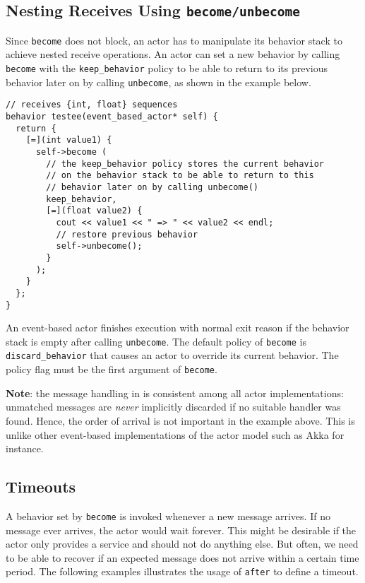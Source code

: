 \clearpage
\subsection{Nesting Receives Using \lstinline^become/unbecome^}

Since \lstinline^become^ does not block, an actor has to manipulate its behavior stack to achieve nested receive operations.
An actor can set a new behavior by calling \lstinline^become^ with the \lstinline^keep_behavior^ policy to be able to return to its previous behavior later on by calling \lstinline^unbecome^, as shown in the example below.

\begin{lstlisting}
// receives {int, float} sequences
behavior testee(event_based_actor* self) {
  return {
    [=](int value1) {
      self->become (
        // the keep_behavior policy stores the current behavior
        // on the behavior stack to be able to return to this
        // behavior later on by calling unbecome()
        keep_behavior,
        [=](float value2) {
          cout << value1 << " => " << value2 << endl;
          // restore previous behavior
          self->unbecome();
        }
      );
    }
  };
}
\end{lstlisting}

An event-based actor finishes execution with normal exit reason if the behavior stack is empty after calling \lstinline^unbecome^.
The default policy of \lstinline^become^ is \lstinline^discard_behavior^ that causes an actor to override its current behavior.
The policy flag must be the first argument of \lstinline^become^.

\textbf{Note}: the message handling in \lib is consistent among all actor implementations: unmatched messages are \textit{never} implicitly discarded if no suitable handler was found.
Hence, the order of arrival is not important in the example above.
This is unlike other event-based implementations of the actor model such as Akka for instance.

\clearpage
\subsection{Timeouts}

A behavior set by \lstinline^become^ is invoked whenever a new message arrives.
If no message ever arrives, the actor would wait forever.
This might be desirable if the actor only provides a service and should not do anything else.
But often, we need to be able to recover if an expected message does not arrive within a certain time period. The following examples illustrates the usage of \lstinline^after^ to define a timeout.

